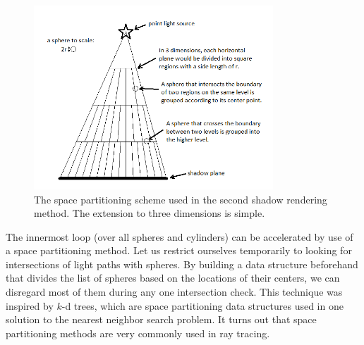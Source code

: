 \documentclass[10pt]{article}
\begin{document}
\begin{figure}[ht]
    \centering
    \includegraphics[width=0.8\textwidth]{clumping_figure.png}
    \caption{The space partitioning scheme used in the second shadow rendering method. The extension to three dimensions is simple.}
    \label{fig:space_partitioning}
\end{figure}

The innermost loop (over all spheres and cylinders) can be accelerated by use of a space partitioning method. Let us restrict ourselves temporarily to looking for intersections of light paths with spheres. By building a data structure beforehand that divides the list of spheres based on the locations of their centers, we can disregard most of them during any one intersection check. This technique was inspired by $k$-d trees, which are space partitioning data structures used in one solution to the nearest neighbor search problem. It turns out that space partitioning methods are very commonly used in ray tracing.
\end{document}
